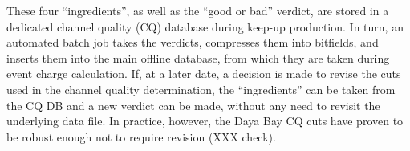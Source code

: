 \documentclass[../thesis.tex]{subfiles}
\begin{document}
These four ``ingredients'', as well as the ``good or bad'' verdict, are stored in a dedicated channel quality (CQ) database during keep-up production. In turn, an automated batch job takes the verdicts, compresses them into bitfields, and inserts them into the main offline database, from which they are taken during event charge calculation. If, at a later date, a decision is made to revise the cuts used in the channel quality determination, the ``ingredients'' can be taken from the CQ DB and a new verdict can be made, without any need to revisit the underlying data file. In practice, however, the Daya Bay CQ cuts have proven to be robust enough not to require revision (XXX check).

\subfilebackmatter
\end{document}
